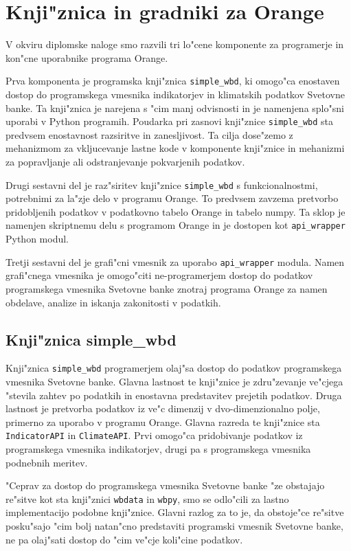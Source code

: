 
\chapter{Knji"znica in gradniki za Orange}

V okviru diplomske naloge smo razvili tri lo"cene komponente za programerje in
kon"cne uporabnike programa Orange. 

Prva komponenta je programska knji"znica \verb|simple_wbd|, ki
omogo"ca enostaven dostop do programskega vmesnika indikatorjev in klimatskih
podatkov Svetovne banke. Ta knji"znica je narejena s "cim manj odvisnosti in je 
namenjena splo"sni uporabi v Python programih. Poudarka pri zasnovi knji"znice 
\verb|simple_wbd| sta predvsem enostavnost razsiritve in zanesljivost. Ta cilja
dose"zemo z mehanizmom za vkljucevanje lastne kode v komponente knji"znice
in mehanizmi za popravljanje ali odstranjevanje pokvarjenih podatkov.

Drugi sestavni del je raz"siritev knji"znice \verb|simple_wbd| s 
funkcionalnostmi, potrebnimi za la"zje delo v programu Orange. To predvsem 
zavzema pretvorbo pridobljenih podatkov v podatkovno tabelo Orange in tabelo 
numpy. Ta sklop je namenjen skriptnemu delu s programom Orange 
\cite{orange_scripting} in je dostopen
kot \verb|api_wrapper| Python modul. 

Tretji sestavni del je grafi"cni vmesnik za uporabo \verb|api_wrapper| modula.
Namen grafi"cnega vmesnika je omogo"citi ne-programerjem dostop do podatkov 
programskega vmesnika Svetovne banke znotraj programa Orange za namen obdelave,
analize in iskanja zakonitosti v podatkih.

\section{Knji"znica simple\_wbd}

Knji"znica \verb|simple_wbd| programerjem olaj"sa dostop do podatkov 
programskega vmesnika Svetovne banke. Glavna lastnost te knji"znice je 
zdru"zevanje ve"cjega "stevila zahtev po podatkih in enostavna predstavitev 
prejetih podatkov. Druga lastnost je pretvorba podatkov iz ve"c dimenzij v 
dvo-dimenzionalno polje, primerno za uporabo v programu Orange. Glavna 
razreda te knji"znice sta \verb|IndicatorAPI| in \verb|ClimateAPI|. Prvi 
omogo"ca pridobivanje podatkov iz programskega vmesnika indikatorjev, drugi pa 
s programskega vmesnika podnebnih meritev.


"Ceprav za dostop do programskega vmesnika Svetovne banke "ze obstajajo 
re"sitve kot sta knji"znici 
\verb|wbdata| in
\verb|wbpy|, smo se odlo"cili
za lastno implementacijo podobne knji"znice. Glavni razlog za to je, da
obstoje"ce re"sitve posku"sajo "cim bolj natan"cno predstaviti programski
vmesnik Svetovne banke, ne pa olaj"sati dostop do "cim ve"cje koli"cine
podatkov.

